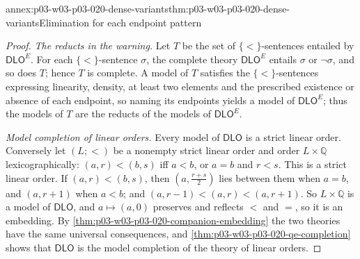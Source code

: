 \begin{annexitem}{annex:p03-w03-p03-020-dense-variants}{thm:p03-w03-p03-020-dense-variants}{Elimination for each endpoint pattern}
\begin{proof}
\emph{The reducts in the warning.} Let \(T\) be the set of
\(\{<\}\)-sentences entailed by \(\mathsf{DLO}^{E}\). For each
\(\{<\}\)-sentence \(\sigma\), the complete theory \(\mathsf{DLO}^{E}\)
entails \(\sigma\) or \(\neg\sigma\), and so does \(T\); hence \(T\) is
complete. A model of \(T\) satisfies the \(\{<\}\)-sentences expressing
linearity, density, at least two elements and the prescribed existence or
absence of each endpoint, so naming its endpoints yields a model of
\(\mathsf{DLO}^{E}\); thus the models of \(T\) are the reducts of the
models of \(\mathsf{DLO}^{E}\).

\emph{Model completion of linear orders.} Every model of \(\mathsf{DLO}\) is a
strict linear order. Conversely let \((L;<)\) be a nonempty strict linear
order and order \(L\times\mathbb Q\) lexicographically:
\((a,r)<(b,s)\) iff \(a<b\), or \(a=b\) and \(r<s\). This is a strict
linear order. If \((a,r)<(b,s)\), then \((a,\tfrac{r+s}2)\) lies between
them when \(a=b\), and \((a,r+1)\) when \(a<b\); and
\((a,r-1)<(a,r)<(a,r+1)\). So \(L\times\mathbb Q\) is a model of
\(\mathsf{DLO}\), and \(a\mapsto(a,0)\) preserves and reflects \(<\) and
\(=\), so it is an embedding. By
\cref{thm:p03-w03-p03-020-companion-embedding} the two theories have the
same universal consequences, and \cref{thm:p03-w03-p03-020-qe-completion}
shows that \(\mathsf{DLO}\) is the model completion of the theory of
linear orders.
\end{proof}
\end{annexitem}

